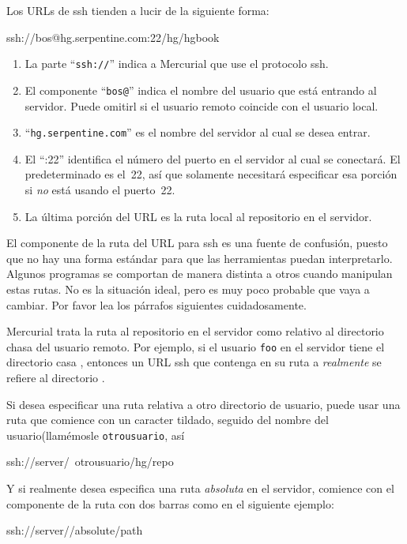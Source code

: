 Los URLs de ssh tienden a lucir de la siguiente forma:
\begin{codesample2}
  ssh://bos@hg.serpentine.com:22/hg/hgbook
\end{codesample2}
\begin{enumerate}
\item La parte ``\texttt{ssh://}'' indica a Mercurial que use el
  protocolo ssh.
\item El componente ``\texttt{bos@}'' indica el nombre del usuario que
  está entrando al servidor.  Puede omitirl si el usuario remoto
  coincide con el usuario local.
\item ``\texttt{hg.serpentine.com}'' es el nombre del servidor al cual
  se desea entrar.
\item El ``:22'' identifica el número del puerto en el servidor al cual
  se conectará.  El predeterminado es el~22, así que solamente
  necesitará especificar esa porción si \emph{no} está usando el
  puerto~22.
\item La última porción del URL es la ruta local al repositorio en el
  servidor.
\end{enumerate}

El componente de la ruta del URL para ssh es una fuente de confusión,
puesto que no hay una forma estándar para que las herramientas puedan
interpretarlo.  Algunos programas se comportan de manera distinta a
otros cuando manipulan estas rutas.  No es la situación ideal, pero
es muy poco probable que vaya a cambiar.  Por favor lea los párrafos
siguientes cuidadosamente.

Mercurial trata la ruta al repositorio en el servidor como relativo al
directorio chasa del usuario remoto.  Por ejemplo, si el usuario
\texttt{foo} en el servidor tiene el directorio casa
,
entonces un URL ssh que contenga en su ruta a 
\emph{realmente} se refiere al directorio .

Si desea especificar una ruta relativa a otro directorio de usuario,
puede usar una ruta que comience con un caracter tildado, seguido del
nombre del usuario(llamémosle \texttt{otrousuario}, así
\begin{codesample2}
  ssh://server/~otrousuario/hg/repo
\end{codesample2}

Y si realmente desea especifica una ruta \emph{absoluta} en el
servidor, comience con el componente de la ruta con dos barras como
en el siguiente ejemplo:
\begin{codesample2}
  ssh://server//absolute/path
\end{codesample2}

